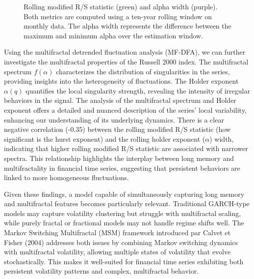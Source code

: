 \documentclass[11pt]{extarticle}
\begin{document}
\begin{figure}[ht]
    \caption{Rolling modified R/S statistic (green) and alpha width (purple). \\
Both metrics are computed using a ten-year rolling window on monthly data. The alpha width represents the difference between the maximum and minimum alpha over the estimation window.}
\end{figure}

\FloatBarrier

Using the multifractal detrended fluctuation analysis (MF-DFA), we can further investigate the multifractal properties of the Russell 2000 index.
The multifractal spectrum $f(\alpha)$ characterizes the distribution of singularities in the series, providing insights into the heterogeneity of fluctuations.
The Holder exponent $\alpha(q)$ quantifies the local singularity strength, revealing the intensity of irregular behaviors in the signal.
The analysis of the multifractal spectrum and Holder exponent offers a detailed and nuanced description of the series' local variability, enhancing our understanding of its underlying dynamics.
There is a clear negative correlation (-0.35) between the rolling modified R/S statistic (how significant is the hurst exponent) and the rolling holder exponent ($\alpha$) width, indicating that higher rolling modified R/S statistic are associated with narrower spectra.
This relationship highlights the interplay between long memory and multifractality in financial time series, suggesting that persistent behaviors are linked to more homogeneous fluctuations.

Given these findings, a model capable of simultaneously capturing long memory and multifractal features becomes particularly
relevant. Traditional GARCH-type models may capture volatility clustering but struggle with multifractal scaling, while
purely fractal or fractional models may not handle regime shifts well. The Markov Switching Multifractal (MSM) framework introduced par Calvet et Fisher
(2004) addresses both issues by combining Markov switching dynamics with multifractal volatility, allowing multiple
states of volatility that evolve stochastically. This makes it well-suited for financial time series
exhibiting both persistent volatility patterns and complex, multifractal behavior.
\end{document}
